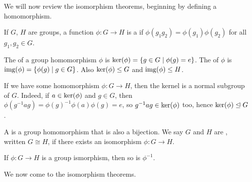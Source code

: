 \documentclass[a4paper]{scrreprt}
\begin{document}

We will now review the isomorphism theorems, beginning by defining a homomorphism.

\begin{definition}
	If $G$, $H$ are groups, a function $\phi: G \rightarrow H$ is a  if
	$
	\phi(g_1 g_2) = \phi(g_1) \phi(g_2)
	$
	for all $g_1, g_2 \in G$.
\end{definition}

\begin{definition}
	The  of a group homomorphism $\phi$ is $\operatorname{ker}(\phi) = \{ g \in G \mid \phi(g) = e\}$.
	The  of $\phi$ is $\operatorname{img}(\phi) = \{ \phi(g) \mid g \in G\}$. Also $\operatorname{ker}(\phi) \leq G$ and $\operatorname{img}(\phi) \leq H$.
\end{definition}



If we have some homomorphism $\phi: G \rightarrow H$, 
then the kernel is a normal subgroup of $G$. Indeed, if $a \in \operatorname{ker}(\phi)$ and $g \in G$, then $\phi(g^{-1}ag) = \phi(g)^{-1} \phi(a) \phi(g) = e$, so $g^{-1}ag \in \operatorname{ker}(\phi)$ too, hence $\operatorname{ker}(\phi) \trianglelefteq G$.

\begin{definition}
	A  is a group homomorphism that is also a bijection. We say $G$ and $H$ are , written $G \cong H$, if there exists an isomorphism $\phi:G \rightarrow H$.
\end{definition}

\begin{remark}
	If $\phi:G \rightarrow H$ is a group ismorphism, then so is $\phi^{-1}$.
\end{remark}

We now come to the isomorphism theorems.
\end{document}
